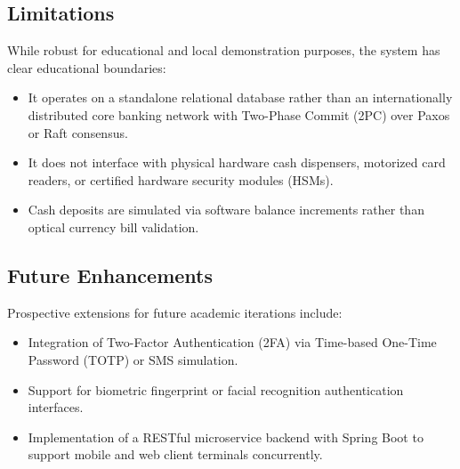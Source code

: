 \documentclass[11pt,a4paper]{report}
\begin{document}
\subsection{Limitations}
While robust for educational and local demonstration purposes, the system has clear educational boundaries:
\begin{itemize}
    \item It operates on a standalone relational database rather than an internationally distributed core banking network with Two-Phase Commit (2PC) over Paxos or Raft consensus.
    \item It does not interface with physical hardware cash dispensers, motorized card readers, or certified hardware security modules (HSMs).
    \item Cash deposits are simulated via software balance increments rather than optical currency bill validation.
\end{itemize}

\subsection{Future Enhancements}
Prospective extensions for future academic iterations include:
\begin{itemize}
    \item Integration of Two-Factor Authentication (2FA) via Time-based One-Time Password (TOTP) or SMS simulation.
    \item Support for biometric fingerprint or facial recognition authentication interfaces.
    \item Implementation of a RESTful microservice backend with Spring Boot to support mobile and web client terminals concurrently.
\end{itemize}

\newpage
\end{document}
